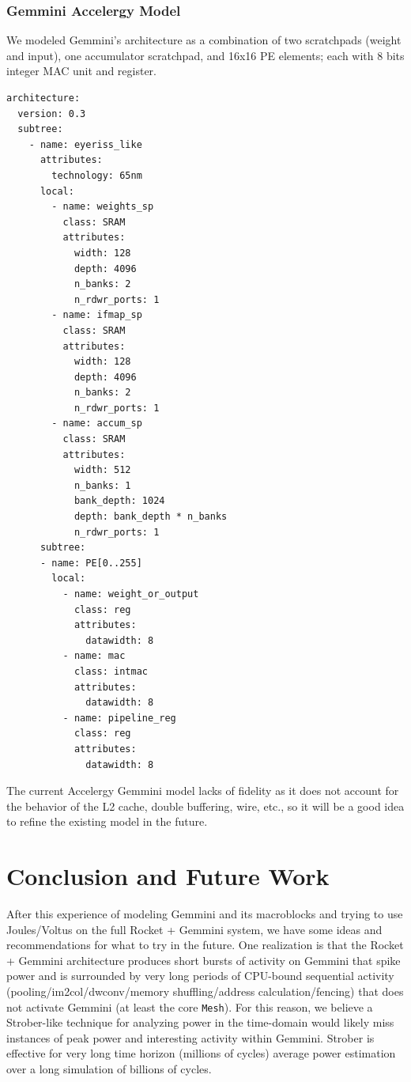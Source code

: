 \documentclass[sigconf]{acmart}
\begin{document}
\subsubsection{Gemmini Accelergy Model}
We modeled Gemmini's architecture as a combination of two scratchpads (weight and input), one accumulator scratchpad, and 16x16 PE elements; each with 8 bits integer MAC unit and register.

\begin{verbatim}
architecture:
  version: 0.3
  subtree:
    - name: eyeriss_like
      attributes:
        technology: 65nm
      local:
        - name: weights_sp
          class: SRAM
          attributes:
            width: 128
            depth: 4096
            n_banks: 2
            n_rdwr_ports: 1
        - name: ifmap_sp
          class: SRAM
          attributes:
            width: 128
            depth: 4096
            n_banks: 2
            n_rdwr_ports: 1
        - name: accum_sp
          class: SRAM
          attributes:
            width: 512
            n_banks: 1
            bank_depth: 1024
            depth: bank_depth * n_banks
            n_rdwr_ports: 1
      subtree:
      - name: PE[0..255]
        local:
          - name: weight_or_output
            class: reg
            attributes:
              datawidth: 8
          - name: mac
            class: intmac
            attributes:
              datawidth: 8
          - name: pipeline_reg
            class: reg
            attributes:
              datawidth: 8
\end{verbatim}

The current Accelergy Gemmini model lacks of fidelity as it does not account for the behavior of the L2 cache, double buffering, wire, etc., so it will be a good idea to refine the existing model in the future.

\section{Conclusion and Future Work}
After this experience of modeling Gemmini and its macroblocks and trying to use Joules/Voltus on the full Rocket + Gemmini system, we have some ideas and recommendations for what to try in the future.
One realization is that the Rocket + Gemmini architecture produces short bursts of activity on Gemmini that spike power and is surrounded by very long periods of CPU-bound sequential activity (pooling/im2col/dwconv/memory shuffling/address calculation/fencing) that does not activate Gemmini (at least the core \texttt{Mesh}).
For this reason, we believe a Strober-like technique for analyzing power in the time-domain would likely miss instances of peak power and interesting activity within Gemmini.
Strober is effective for very long time horizon (millions of cycles) average power estimation over a long simulation of billions of cycles.
\end{document}
